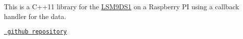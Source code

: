 This is a C++11 library for the \mbox{\hyperlink{classLSM9DS1}{L\+S\+M9\+D\+S1}} on a Raspberry PI using a callback handler for the data.

\href{https://github.com/berndporr/LSM9DS1_RaspberryPi_CPP_Library}{\texttt{ github repository}} 
